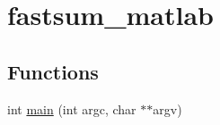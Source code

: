 \hypertarget{group__applications__fastsum__matlab}{
\section{fastsum\_\-matlab}
\label{group__applications__fastsum__matlab}
}
\subsection*{Functions}
\begin{CompactItemize}
\item 
\hypertarget{group__applications__fastsum__matlab_g3c04138a5bfe5d72780bb7e82a18e627}{
int \hyperlink{group__applications__fastsum__matlab_g3c04138a5bfe5d72780bb7e82a18e627}{main} (int argc, char $\ast$$\ast$argv)}
\label{group__applications__fastsum__matlab_g3c04138a5bfe5d72780bb7e82a18e627}

\end{CompactItemize}
